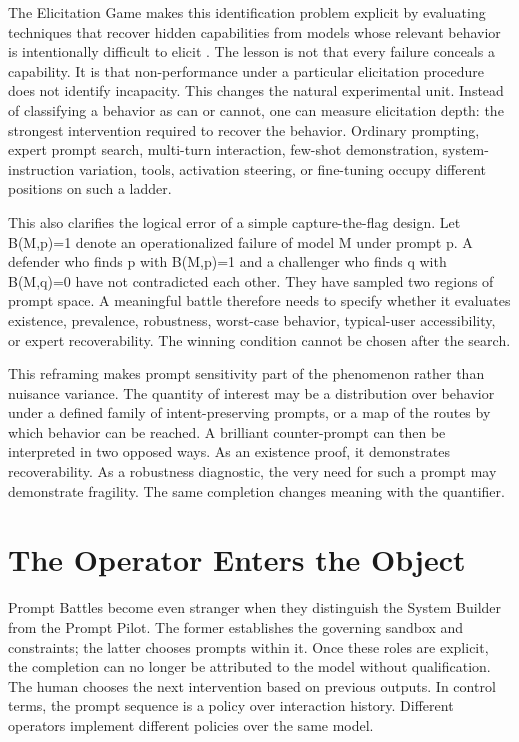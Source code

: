 \documentclass[11pt]{article}
\begin{document}
The Elicitation Game makes this identification problem explicit by evaluating techniques that recover hidden capabilities from models whose relevant behavior is intentionally difficult to elicit \cite{hofstatter2025elicitation}. The lesson is not that every failure conceals a capability. It is that non-performance under a particular elicitation procedure does not identify incapacity. This changes the natural experimental unit. Instead of classifying a behavior as can or cannot, one can measure elicitation depth: the strongest intervention required to recover the behavior. Ordinary prompting, expert prompt search, multi-turn interaction, few-shot demonstration, system-instruction variation, tools, activation steering, or fine-tuning occupy different positions on such a ladder.

This also clarifies the logical error of a simple capture-the-flag design. Let B(M,p)=1 denote an operationalized failure of model M under prompt p. A defender who finds p with B(M,p)=1 and a challenger who finds q with B(M,q)=0 have not contradicted each other. They have sampled two regions of prompt space. A meaningful battle therefore needs to specify whether it evaluates existence, prevalence, robustness, worst-case behavior, typical-user accessibility, or expert recoverability. The winning condition cannot be chosen after the search.

This reframing makes prompt sensitivity part of the phenomenon rather than nuisance variance. The quantity of interest may be a distribution over behavior under a defined family of intent-preserving prompts, or a map of the routes by which behavior can be reached. A brilliant counter-prompt can then be interpreted in two opposed ways. As an existence proof, it demonstrates recoverability. As a robustness diagnostic, the very need for such a prompt may demonstrate fragility. The same completion changes meaning with the quantifier.

\section{The Operator Enters the Object}
Prompt Battles become even stranger when they distinguish the System Builder from the Prompt Pilot. The former establishes the governing sandbox and constraints; the latter chooses prompts within it. Once these roles are explicit, the completion can no longer be attributed to the model without qualification. The human chooses the next intervention based on previous outputs. In control terms, the prompt sequence is a policy over interaction history. Different operators implement different policies over the same model.
\end{document}
